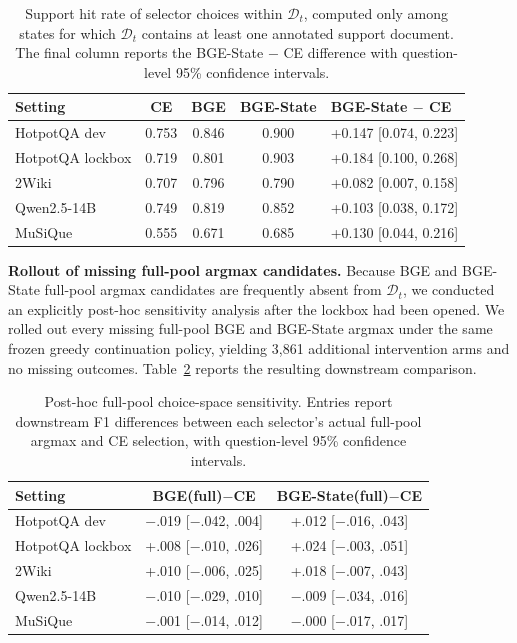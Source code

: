 \documentclass[10pt]{article}
\newcommand{\stitle}[1]{\vspace{0.4em}\noindent\textbf{#1}\hspace{0.6em}}
\begin{document}
\begin{table}[h]
\centering
\small
\caption{Support hit rate of selector choices within $\mathcal{D}_t$, computed
only among states for which $\mathcal{D}_t$ contains at least one annotated
support document. The final column reports the BGE-State $-$ CE difference
with question-level 95\% confidence intervals.}
\label{tab:s2}
\begin{tabular}{lcccl}
\toprule
\textbf{Setting} & \textbf{CE} & \textbf{BGE} & \textbf{BGE-State} &
\textbf{BGE-State $-$ CE} \\
\midrule
HotpotQA dev     & 0.753 & 0.846 & 0.900 & +0.147 [0.074, 0.223] \\
HotpotQA lockbox & 0.719 & 0.801 & 0.903 & +0.184 [0.100, 0.268] \\
2Wiki            & 0.707 & 0.796 & 0.790 & +0.082 [0.007, 0.158] \\
Qwen2.5-14B      & 0.749 & 0.819 & 0.852 & +0.103 [0.038, 0.172] \\
MuSiQue          & 0.555 & 0.671 & 0.685 & +0.130 [0.044, 0.216] \\
\bottomrule
\end{tabular}
\end{table}

\stitle{Rollout of missing full-pool argmax candidates.}
Because BGE and BGE-State full-pool argmax candidates are frequently absent
from $\mathcal{D}_t$, we conducted an explicitly post-hoc sensitivity analysis
after the lockbox had been opened. We rolled out every missing full-pool BGE
and BGE-State argmax under the same frozen greedy continuation policy,
yielding 3{,}861 additional intervention arms and no missing outcomes.
Table~\ref{tab:s3} reports the resulting downstream comparison.

\begin{table}[h]
\centering
\small
\caption{Post-hoc full-pool choice-space sensitivity. Entries report
downstream F1 differences between each selector's actual full-pool argmax and
CE selection, with question-level 95\% confidence intervals.}
\label{tab:s3}
\begin{tabular}{lcc}
\toprule
\textbf{Setting} & \textbf{BGE(full)$-$CE} & \textbf{BGE-State(full)$-$CE} \\
\midrule
HotpotQA dev     & $-$.019 [$-$.042, .004] & +.012 [$-$.016, .043] \\
HotpotQA lockbox & +.008 [$-$.010, .026]   & +.024 [$-$.003, .051] \\
2Wiki            & +.010 [$-$.006, .025]   & +.018 [$-$.007, .043] \\
Qwen2.5-14B      & $-$.010 [$-$.029, .010] & $-$.009 [$-$.034, .016] \\
MuSiQue          & $-$.001 [$-$.014, .012] & $-$.000 [$-$.017, .017] \\
\bottomrule
\end{tabular}
\end{table}
\end{document}
